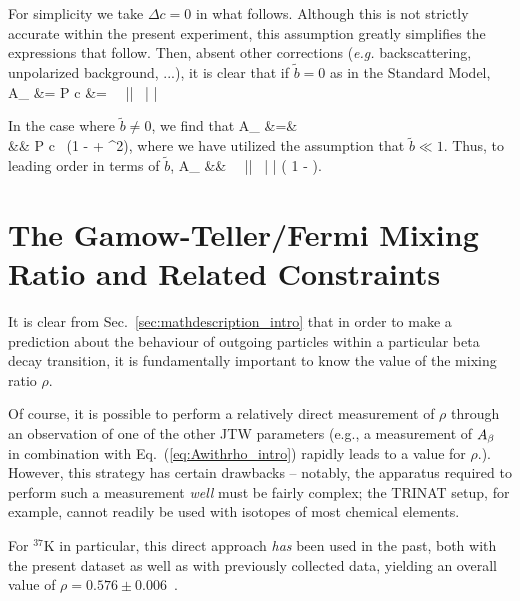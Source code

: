 For simplicity we take $\Delta c = 0$ in what follows.  Although this is not strictly accurate within the present experiment, this assumption greatly simplifies the expressions that follow.  Then, absent other corrections (\emph{e.g.} backscattering, unpolarized background, ...), it is clear that if $\tilde{b} = 0$ as in the Standard Model, %
\bea
A_{} &=\;\;  P c &=\;\; \Abeta \,  \, || \, \langle | \cos\theta | \rangle
\eea

In the case where $\tilde{b} \neq 0$, we find that 
\bea
A_{} &=&  \\
&\approx&   P c \, (1 -  + {}^2),
\eea
where we have utilized the assumption that $\tilde{b} \ll 1$.
Thus, to leading order in terms of $\tilde{b}$, 
\bea
A_{} &\approx& \Abeta \,  \, || \, \langle | \cos\theta | \rangle \left( 1 - \bFierz {} \right).
\eea














\section{The Gamow-Teller/Fermi Mixing Ratio and Related Constraints}
\label{sec:extractinglambda}
It is clear from Sec.~\ref{sec:mathdescription_intro} that in order to make a prediction about the behaviour of outgoing particles within a particular beta decay transition, it is fundamentally important to know the value of the mixing ratio $\rho$.

Of course, it is possible to perform a relatively direct measurement of $\rho$ through an observation of one of the other \ac{JTW} parameters (e.g., a measurement of $A_{\beta}$ in combination with Eq.~(\ref{eq:Awithrho_intro}) rapidly leads to a value for $\rho$.).  However, this strategy has certain drawbacks -- notably, the apparatus required to perform such a measurement \emph{well} must be fairly complex;  the TRINAT setup, for example, cannot readily be used with isotopes of most chemical elements.  

For $^{37}$K in particular, this direct approach \emph{has} been used in the past, both with the present dataset as well as with previously collected data, yielding an overall value of $\rho=0.576 \pm 0.006$~\cite{ben_Abeta}\cite{shidling2014}\cite{dan_Bnu}.

